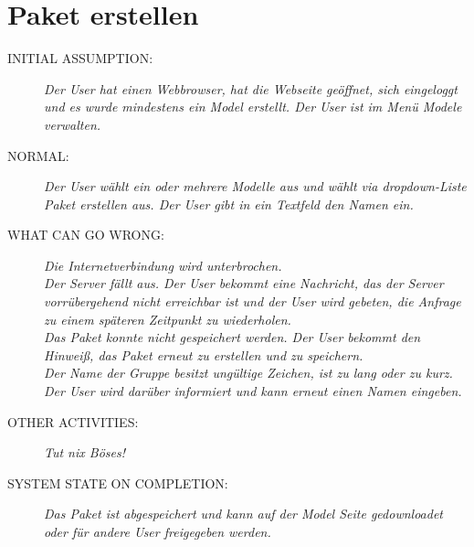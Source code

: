 {\section{Paket erstellen}
\begin{description}
  \item [INITIAL ASSUMPTION:]
    \textit{Der \gls{User} hat einen Webbrowser, hat die Webseite geöffnet, sich eingeloggt und es wurde mindestens ein \gls{Model} erstellt. Der \gls{User} ist im Menü \gls{Model}e verwalten.}
  \item [NORMAL:]
    \textit{Der \gls{User} wählt ein oder mehrere \gls{Modelle} aus und wählt via \gls{dropdown-Liste} \gls{Paket} erstellen aus. Der \gls{User} gibt in ein Textfeld den Namen ein. } 
  \item [WHAT CAN GO WRONG:]
    \textit{Die Internetverbindung wird unterbrochen.\\
Der Server fällt aus. Der \gls{User} bekommt eine Nachricht, das der Server vorrübergehend nicht erreichbar ist und der \gls{User} wird gebeten, die Anfrage zu einem späteren Zeitpunkt zu wiederholen.\\
Das \gls{Paket} konnte nicht gespeichert werden. Der \gls{User} bekommt den Hinweiß, das \gls{Paket} erneut zu erstellen und zu speichern.\\
Der Name der \gls{Gruppe} besitzt ungültige Zeichen, ist zu lang oder zu kurz. Der \gls{User} wird darüber informiert und kann erneut einen Namen eingeben.}
  \item [OTHER ACTIVITIES:]
    \textit{Tut nix Böses!}
  \item [SYSTEM STATE ON COMPLETION:]
    \textit{Das \gls{Paket} ist abgespeichert und kann auf der \gls{Model} Seite gedownloadet oder für andere \gls{User} freigegeben werden.}
\end{description}

}
